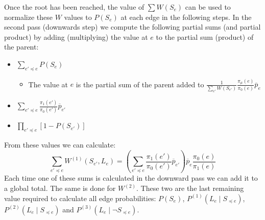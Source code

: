 \documentclass[../../main.tex]{subfiles}
\begin{document}
Once the root has been reached, the value of $\sum W(S_e)$ can be used to normalize these $W$ values to $P(S_e)$ at each edge in the following steps.
In the second pass (downwards step) we compute the following partial sums (and partial product) by adding (multiplying) the value at $e$ to the partial sum (product) of the parent:
\begin{itemize}
    \item $\sum_{e'\preceq e} P(S_e)$
        \begin{itemize}
            \item The value at $e$ is the partial sum of the parent added to $\frac{1}{\sum_{e'} W(S_{e'})}\frac{\pi_\mu(e)}{\pi_0(e)}\overline{p}_e$
        \end{itemize}
    \item $\sum_{e'\preceq e}\frac{\pi_1(e')}{\pi_0(e')}\overline{p}_{e'}$
    \item $\prod_{e'\preceq e}\left[1-P(S_{e'})\right]$
\end{itemize}

From these values we can calculate:
\begin{equation*}
    \sum_{e'\preceq e}W^{(1)}(S_{e'},L_e) = \left(\sum_{e'\preceq e}\frac{\pi_1(e')}{\pi_0(e')}\overline{p}_{e'}\right)\overline{p}_e\frac{\pi_0(e)}{\pi_1(e)}
\end{equation*}
Each time one of these sums is calculated in the downward pass we can add it to a global total.
The same is done for $W^{(2)}$.
These two are the last remaining value required to calculate all edge probabilities: $P(S_e)$, $P^{(1)}(L_e\mid S_{\preceq e})$, $P^{(2)}(L_e\mid S_{\preceq e})$ and $P^{(3)}(L_e\mid \neg S_{\preceq e})$.
\end{document}
